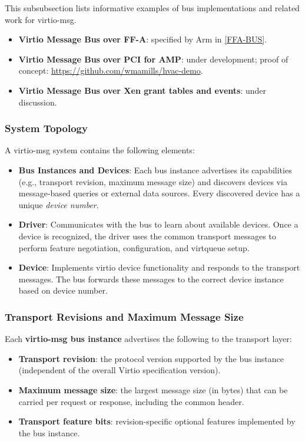 This subsubsection lists informative examples of bus implementations and related
work for virtio-msg.

\begin{itemize}
  \item \textbf{Virtio Message Bus over FF-A}: specified by Arm in
        \hyperref[intro:FFA-BUS]{[FFA-BUS]}.
  \item \textbf{Virtio Message Bus over PCI for AMP}: under development; proof
        of concept:
        \url{https://github.com/wmamills/hvac-demo}.
  \item \textbf{Virtio Message Bus over Xen grant tables and events}: under
        discussion.
\end{itemize}

\subsubsection{System Topology}

A virtio-msg system contains the following elements:

\begin{itemize}
  \item \textbf{Bus Instances and Devices}: Each bus instance advertises its
        capabilities (e.g., transport revision, maximum message size) and
        discovers devices via message-based queries or external data sources.
        Every discovered device has a unique \emph{device number}.
  \item \textbf{Driver}: Communicates with the bus to learn about
        available devices. Once a device is recognized, the driver uses the
        common transport messages to perform feature negotiation, configuration,
        and virtqueue setup.
  \item \textbf{Device}: Implements virtio device functionality and
        responds to the transport messages. The bus forwards these messages to
        the correct device instance based on device number.
\end{itemize}

\subsubsection{Transport Revisions and Maximum Message Size}
\label{sec:Virtio Transport Options / Virtio Over Messages / Basic Concepts / Revisions}

Each \textbf{virtio-msg bus instance} advertises the following to the transport
layer:
\begin{itemize}
  \item \textbf{Transport revision}: the protocol version supported by the bus
        instance (independent of the overall Virtio specification version).
  \item \textbf{Maximum message size}: the largest message size (in bytes) that
        can be carried per request or response, including the common header.
  \item \textbf{Transport feature bits}: revision-specific optional features
        implemented by the bus instance.
\end{itemize}

